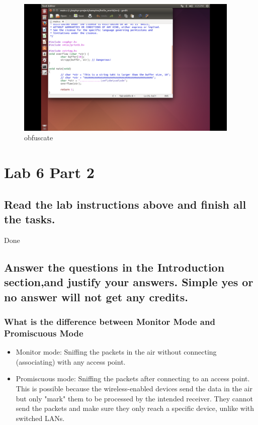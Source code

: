 \documentclass[onecolumn,oneside]{SUSTechHomework}
\begin{document}
      \begin{figure}[H]
        \centering
        \includegraphics[width=0.95\textwidth]{img/pic2.png}
        \caption{obfuscate}
      \end{figure}

  \section{Lab 6 Part 2}

    \subsection{Read the lab instructions above and finish all the tasks.}

    Done

    \subsection{Answer the questions in the Introduction section,and justify your answers. Simple yes or no answer will not get any credits.}

      \subsubsection{What is the difference between Monitor Mode and Promiscuous Mode}

      \begin{itemize}
        \item Monitor mode: Sniffing the packets in the air without connecting (associating) with any access point.
        \item Promiscuous mode: Sniffing the packets after connecting to an access point. This is possible because the wireless-enabled devices send the data in the air but only "mark" them to be processed by the intended receiver. They cannot send the packets and make sure they only reach a specific device, unlike with switched LANs.
      \end{itemize}
\end{document}
